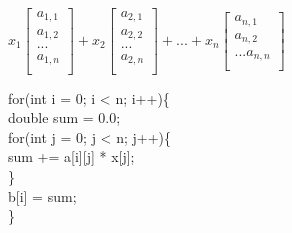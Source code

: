 \documentclass[12pt, AMS Euler]{article}
\begin{document}
$ x_1
\begin{bmatrix}
	a_{1,1}\\
	a_{1,2}\\
	...\\
	a_{1,n}\\
\end{bmatrix}
+ x_2
\begin{bmatrix}
	a_{2,1}\\
	a_{2,2}\\
	...\\
	a_{2,n}\\
\end{bmatrix}
+ ... + x_n
\begin{bmatrix}
	a_{n,1}\\
	a_{n,2}\\
	...
	a_{n,n}\\
\end{bmatrix}
$
\begin{listings}

for(int i = 0; i < n; i++)\{\\
	double sum = 0.0;\\
	for(int j = 0; j < n; j++)\{\\
		sum += a[i][j] * x[j];\\
	\}\\
	b[i] = sum;\\
	\}\\
\end{listings}

\noindent \underline{\hspace{3in}}\\
\end{document}
